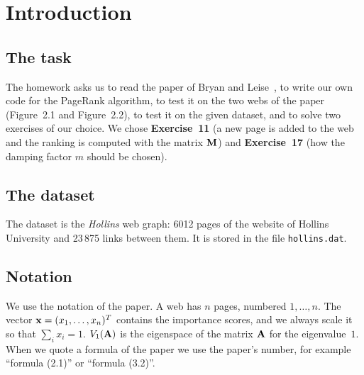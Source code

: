 \section{Introduction}

\subsection*{The task}

The homework asks us to read the paper of Bryan and Leise~\cite{bryanleise}, to write our own code for the PageRank algorithm, to test it on the two webs of the paper (Figure~2.1 and Figure~2.2), to test it on the given dataset, and to solve two exercises of our choice.
We chose \textbf{Exercise~11} (a new page is added to the web and the ranking is computed with the matrix $\mathbf{M}$) and \textbf{Exercise~17} (how the damping factor $m$ should be chosen).

\subsection*{The dataset}

The dataset is the \emph{Hollins} web graph: 6012 pages of the website of Hollins University and 23\,875 links between them.
It is stored in the file \texttt{hollins.dat}.

\subsection*{Notation}

We use the notation of the paper.
A web has $n$ pages, numbered $1,\dots,n$.
The vector $\mathbf{x} = (x_1,\dots,x_n)^T$ contains the importance scores, and we always scale it so that $\sum_i x_i = 1$.
$V_1(\mathbf{A})$ is the eigenspace of the matrix $\mathbf{A}$ for the eigenvalue~$1$.
When we quote a formula of the paper we use the paper's number, for example ``formula (2.1)'' or ``formula (3.2)''.

